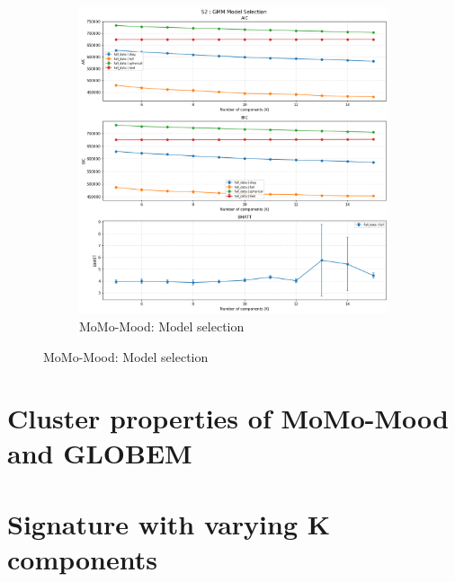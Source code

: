 \begin{appendices}
\begin{figure}[htbp]
  \begin{subfigure}[t]{\textwidth}
    \centering
    \includegraphics[width=\textwidth]{figures/appendix/momo_gmm_model_selection.png}
    \caption{MoMo-Mood: Model selection}
    \label{fig:s2_sel}
  \end{subfigure}

  \label{fig:two-rows}
\end{figure}

\section{Cluster properties of MoMo-Mood and GLOBEM}

\section{Signature with varying K components}


\end{appendices}